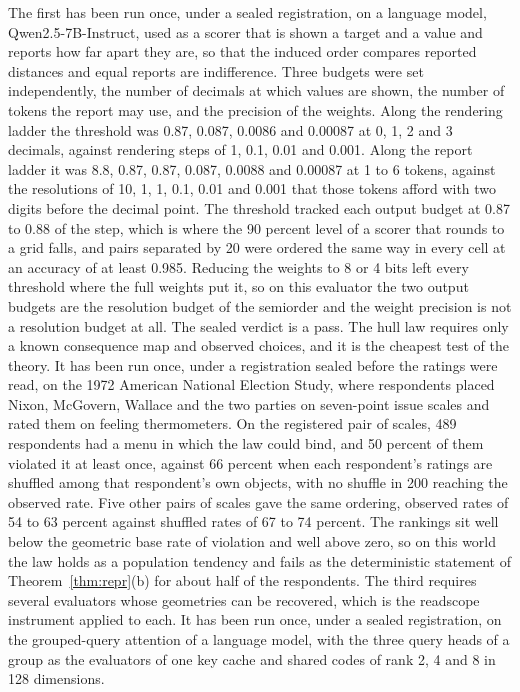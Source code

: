 \documentclass[11pt]{article}
\theoremstyle{definition}
\theoremstyle{remark}
\begin{document}
The first has been run once, under a sealed registration, on a language model, Qwen2.5-7B-Instruct, used as a scorer that is shown a target and a value and reports how far apart they are, so that the induced order compares reported distances and equal reports are indifference.
Three budgets were set independently, the number of decimals at which values are shown, the number of tokens the report may use, and the precision of the weights.
Along the rendering ladder the threshold was 0.87, 0.087, 0.0086 and 0.00087 at 0, 1, 2 and 3 decimals, against rendering steps of 1, 0.1, 0.01 and 0.001.
Along the report ladder it was 8.8, 0.87, 0.87, 0.087, 0.0088 and 0.00087 at 1 to 6 tokens, against the resolutions of 10, 1, 1, 0.1, 0.01 and 0.001 that those tokens afford with two digits before the decimal point.
The threshold tracked each output budget at 0.87 to 0.88 of the step, which is where the 90 percent level of a scorer that rounds to a grid falls, and pairs separated by 20 were ordered the same way in every cell at an accuracy of at least 0.985.
Reducing the weights to 8 or 4 bits left every threshold where the full weights put it, so on this evaluator the two output budgets are the resolution budget of the semiorder and the weight precision is not a resolution budget at all.
The sealed verdict is a pass.
The hull law requires only a known consequence map and observed choices, and it is the cheapest test of the theory.
It has been run once, under a registration sealed before the ratings were read, on the 1972 American National Election Study, where respondents placed Nixon, McGovern, Wallace and the two parties on seven-point issue scales and rated them on feeling thermometers.
On the registered pair of scales, 489 respondents had a menu in which the law could bind, and 50 percent of them violated it at least once, against 66 percent when each respondent's ratings are shuffled among that respondent's own objects, with no shuffle in 200 reaching the observed rate.
Five other pairs of scales gave the same ordering, observed rates of 54 to 63 percent against shuffled rates of 67 to 74 percent.
The rankings sit well below the geometric base rate of violation and well above zero, so on this world the law holds as a population tendency and fails as the deterministic statement of Theorem~\ref{thm:repr}(b) for about half of the respondents.
The third requires several evaluators whose geometries can be recovered, which is the readscope instrument applied to each.
It has been run once, under a sealed registration, on the grouped-query attention of a language model, with the three query heads of a group as the evaluators of one key cache and shared codes of rank 2, 4 and 8 in 128 dimensions.
\end{document}
